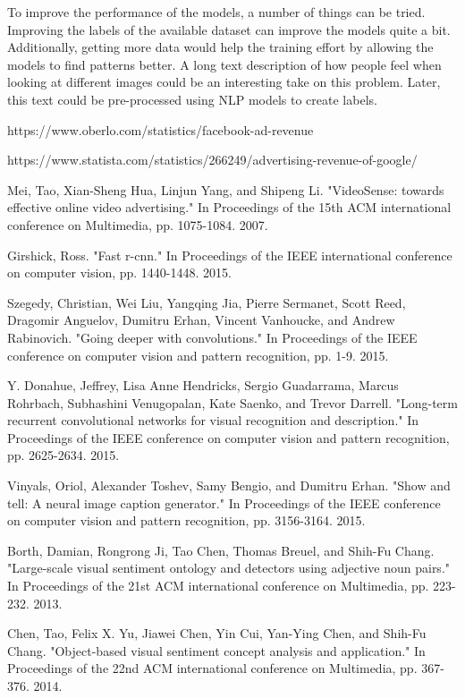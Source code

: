 \documentclass[conference]{IEEEtran}
\begin{document}
To improve the performance of the models, a number of things can be tried. Improving the labels of the available dataset can improve the models quite a bit. Additionally, getting more data would help the training effort by allowing the models to find patterns better. A long text description of how people feel when looking at different images could be an interesting take on this problem. Later, this text could be pre-processed using NLP models to create labels.

\begin{thebibliography}{00}
 https://www.oberlo.com/statistics/facebook-ad-revenue

 https://www.statista.com/statistics/266249/advertising-revenue-of-google/

 Mei, Tao, Xian-Sheng Hua, Linjun Yang, and Shipeng Li. "VideoSense: towards effective online video advertising." In Proceedings of the 15th ACM international conference on Multimedia, pp. 1075-1084. 2007.

 Girshick, Ross. "Fast r-cnn." In Proceedings of the IEEE international conference on computer vision, pp. 1440-1448. 2015.

 Szegedy, Christian, Wei Liu, Yangqing Jia, Pierre Sermanet, Scott Reed, Dragomir Anguelov, Dumitru Erhan, Vincent Vanhoucke, and Andrew Rabinovich. "Going deeper with convolutions." In Proceedings of the IEEE conference on computer vision and pattern recognition, pp. 1-9. 2015.

 Y. Donahue, Jeffrey, Lisa Anne Hendricks, Sergio Guadarrama, Marcus Rohrbach, Subhashini Venugopalan, Kate Saenko, and Trevor Darrell. "Long-term recurrent convolutional networks for visual recognition and description." In Proceedings of the IEEE conference on computer vision and pattern recognition, pp. 2625-2634. 2015.

 Vinyals, Oriol, Alexander Toshev, Samy Bengio, and Dumitru Erhan. "Show and tell: A neural image caption generator." In Proceedings of the IEEE conference on computer vision and pattern recognition, pp. 3156-3164. 2015.

 Borth, Damian, Rongrong Ji, Tao Chen, Thomas Breuel, and Shih-Fu Chang. "Large-scale visual sentiment ontology and detectors using adjective noun pairs." In Proceedings of the 21st ACM international conference on Multimedia, pp. 223-232. 2013.

 Chen, Tao, Felix X. Yu, Jiawei Chen, Yin Cui, Yan-Ying Chen, and Shih-Fu Chang. "Object-based visual sentiment concept analysis and application." In Proceedings of the 22nd ACM international conference on Multimedia, pp. 367-376. 2014.


\end{thebibliography}
\end{document}
